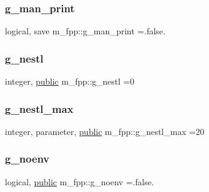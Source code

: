 \mbox{\label{namespacem__fpp_aa87c73c76d03c533762f3c9d807785e7}} 
\subsubsection{\texorpdfstring{g\+\_\+man\+\_\+print}{g\_man\_print}}
{\footnotesize\ttfamily logical, save m\+\_\+fpp\+::g\+\_\+man\+\_\+print =.false.}

\mbox{\label{namespacem__fpp_a0278720ea2a632b04d6812ac5b2d443e}} 
\subsubsection{\texorpdfstring{g\+\_\+nestl}{g\_nestl}}
{\footnotesize\ttfamily integer, \hyperlink{M__stopwatch_83_8txt_a2f74811300c361e53b430611a7d1769f}{public} m\+\_\+fpp\+::g\+\_\+nestl =0}

\mbox{\label{namespacem__fpp_a8d8e200282a7bfd05dfd73337a7bf4e0}} 
\subsubsection{\texorpdfstring{g\+\_\+nestl\+\_\+max}{g\_nestl\_max}}
{\footnotesize\ttfamily integer, parameter, \hyperlink{M__stopwatch_83_8txt_a2f74811300c361e53b430611a7d1769f}{public} m\+\_\+fpp\+::g\+\_\+nestl\+\_\+max =20}

\mbox{\label{namespacem__fpp_a495064207d70c0d79f3506fb735d4f07}} 
\subsubsection{\texorpdfstring{g\+\_\+noenv}{g\_noenv}}
{\footnotesize\ttfamily logical, \hyperlink{M__stopwatch_83_8txt_a2f74811300c361e53b430611a7d1769f}{public} m\+\_\+fpp\+::g\+\_\+noenv =.false.}

